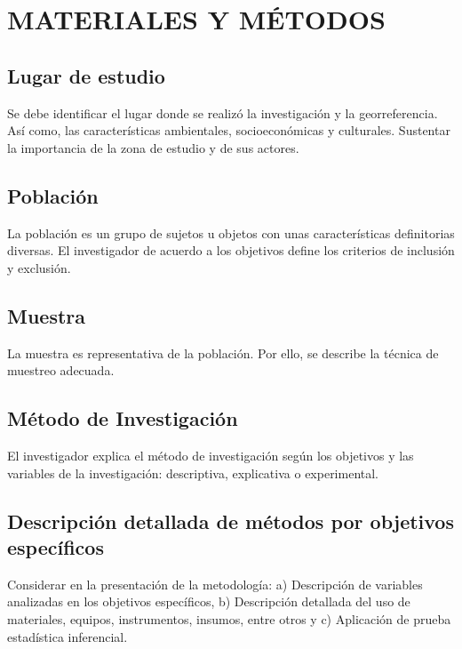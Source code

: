 \titlespacing{\chapter}{0pt}{120pt}{7pt}
\chapter{MATERIALES Y MÉTODOS}
\label{cap:metodologia}

\section{Lugar de estudio}

Se debe identificar el lugar donde se realizó la investigación y la georreferencia. Así como, las características ambientales, socioeconómicas y culturales. Sustentar la importancia de la zona de estudio y de sus actores.

\section{Población}

La población es un grupo de sujetos u objetos con unas características definitorias diversas. El investigador de acuerdo a los objetivos define los criterios de inclusión y exclusión.

\section{Muestra}

La muestra es representativa de la población. Por ello, se describe la técnica de muestreo adecuada.

\section{Método de Investigación}

El investigador explica el método de investigación según los objetivos y las variables de la investigación: descriptiva, explicativa o experimental.


\section{Descripción detallada de métodos por objetivos específicos}

Considerar en la presentación de la metodología: a) Descripción de variables analizadas en los objetivos específicos, b) Descripción detallada del uso de materiales, equipos, instrumentos, insumos, entre otros y c) Aplicación de prueba estadística inferencial.